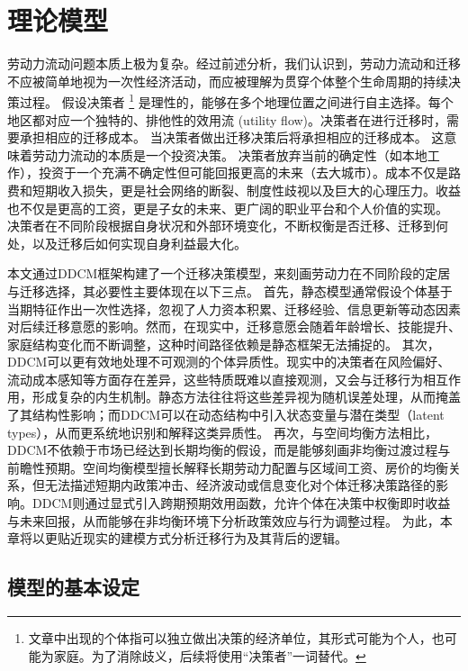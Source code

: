 \documentclass[
  a4paper,
  zihao=-4,
  fontset=mac,
  AutoFakeBold,
  AutoFakeSlant,
  oneside]{ctexbook}
\let\oldfootnote\footnote
\renewcommand{\footnote}[1]{%
  \oldfootnote{\setstretch{1.5}#1}%
}
\begin{document}
\chapter{理论模型}

劳动力流动问题本质上极为复杂。经过前述分析，我们认识到，劳动力流动和迁移不应被简单地视为一次性经济活动，而应被理解为贯穿个体整个生命周期的持续决策过程。
假设决策者\footnote{文章中出现的个体指可以独立做出决策的经济单位，其形式可能为个人，也可能为家庭。为了消除歧义，后续将使用“决策者”一词替代。}是理性的，能够在多个地理位置之间进行自主选择。每个地区都对应一个独特的、排他性的效用流 (utility flow)。决策者在进行迁移时，需要承担相应的迁移成本。
当决策者做出迁移决策后将承担相应的迁移成本。
这意味着劳动力流动的本质是一个投资决策。
决策者放弃当前的确定性（如本地工作），投资于一个充满不确定性但可能回报更高的未来（去大城市）。成本不仅是路费和短期收入损失，更是社会网络的断裂、制度性歧视以及巨大的心理压力。收益也不仅是更高的工资，更是子女的未来、更广阔的职业平台和个人价值的实现。
决策者在不同阶段根据自身状况和外部环境变化，不断权衡是否迁移、迁移到何处，以及迁移后如何实现自身利益最大化。

本文通过DDCM框架构建了一个迁移决策模型，来刻画劳动力在不同阶段的定居与迁移选择，其必要性主要体现在以下三点。
首先，静态模型通常假设个体基于当期特征作出一次性选择，忽视了人力资本积累、迁移经验、信息更新等动态因素对后续迁移意愿的影响。然而，在现实中，迁移意愿会随着年龄增长、技能提升、家庭结构变化而不断调整，这种时间路径依赖是静态框架无法捕捉的。  
其次，DDCM可以更有效地处理不可观测的个体异质性。现实中的决策者在风险偏好、流动成本感知等方面存在差异，这些特质既难以直接观测，又会与迁移行为相互作用，形成复杂的内生机制。静态方法往往将这些差异视为随机误差处理，从而掩盖了其结构性影响；而DDCM可以在动态结构中引入状态变量与潜在类型（latent types），从而更系统地识别和解释这类异质性。  
再次，与空间均衡方法相比，DDCM不依赖于市场已经达到长期均衡的假设，而是能够刻画非均衡过渡过程与前瞻性预期。空间均衡模型擅长解释长期劳动力配置与区域间工资、房价的均衡关系，但无法描述短期内政策冲击、经济波动或信息变化对个体迁移决策路径的影响。DDCM则通过显式引入跨期预期效用函数，允许个体在决策中权衡即时收益与未来回报，从而能够在非均衡环境下分析政策效应与行为调整过程。 
为此，本章将以更贴近现实的建模方式分析迁移行为及其背后的逻辑。

\section{模型的基本设定}
\end{document}
